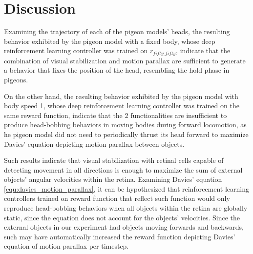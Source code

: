 \chapter{Discussion}
  Examining the trajectory of each of the pigeon models' heads, the resulting behavior exhibited by the pigeon model with a fixed body, whose deep reinforcement learning controller was trained on $r_{fifty\_fifty}$, indicate that the combination of visual stabilization and motion parallax are sufficient to generate a behavior that fixes the position of the head, resembling the hold phase in pigeons.

  On the other hand, the resulting behavior exhibited by the pigeon model with body speed 1, whose deep reinforcement learning controller was trained on the same reward function, indicate that the 2 functionalities are insufficient to produce head-bobbing behaviors in moving bodies during forward locomotion, as he pigeon model did not need to periodically thrust its head forward to maximize Davies' equation depicting motion parallax between objects.

  Such results indicate that visual stabilization with retinal cells capable of detecting movement in all directions is enough to maximize the sum of external objects' angular velocities within the retina.
    Examining Davies' equation \ref{equ:davies_motion_parallax}, it can be hypothesized that reinforcement learning controllers trained on reward function that reflect such function would only reproduce head-bobbing behaviors when all objects within the retina are globally static, since the equation does not account for the objects' velocities.
    Since the external objects in our experiment had objects moving forwards and backwards, such may have automatically increased the reward function depicting Davies' equation of motion parallax per timestep.




